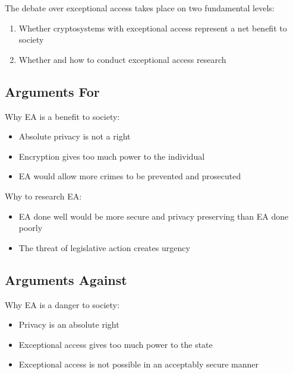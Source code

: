 

The debate over exceptional access takes place on two fundamental levels:
\begin{enumerate}
    \item Whether cryptosystems with exceptional access represent a net benefit to society
    \item Whether and how to conduct exceptional access research
\end{enumerate}

\subsection{Arguments For}

Why EA is a benefit to society:
\begin{itemize}
    \item Absolute privacy is not a right
    \item Encryption gives too much power to the individual
    \item EA would allow more crimes to be prevented and prosecuted
\end{itemize}

Why to research EA:
\begin{itemize}
    \item EA done well would be more secure and privacy preserving than EA done poorly
    \item The threat of legislative action creates urgency
\end{itemize}

\subsection{Arguments Against}

Why EA is a danger to society:
\begin{itemize}
    \item Privacy is an absolute right
    \item Exceptional access gives too much power to the state
    \item Exceptional access is not possible in an acceptably secure manner
\end{itemize}

